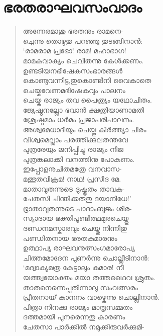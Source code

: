 
\section{ഭരതരാഘവസംവാദം}

\begin{verse}
അന്നേരമാശു ഭരതനും രാമനെ-\\
ച്ചെന്നു തൊഴുതു പറഞ്ഞു തുടങ്ങിനാന്‍:\\
‘രാമരാമ പ്രഭോ! രാമ! മഹാഭാഗ!\\
മാമകവാക്യം ചെവിതന്നു കേള്‍ക്കണം.\\
ഉണ്ടടിയനഭിഷേകസംഭാരങ്ങള്‍\\
കൊണ്ടുവന്നിട്ട,തുകൊണ്ടിനി വൈകാതെ\\
ചെയ്കവേണമഭിഷേകവും പാലനം\\
ചെയ്ക രാജ്യം തവ പൈത്ര്യം യഥോചിതം.\\
ജ്യേഷ്ഠനല്ലോ ഭവാന്‍ ക്ഷത്രിയാണാമതി\\
ശ്രേഷ്ഠമാം ധര്‍മം പ്രജാപരിപാലനം.\\
അശ്വമേധാദിയും ചെയ്തു കീര്‍ത്ത്യാ ചിരം\\
വിശ്വമെല്ലാം പരത്തിക്കുലതന്തവേ\\
പുത്രരേയും ജനിപ്പിച്ചു രാജ്യം നിജ\\
പുത്രങ്കലാക്കി വനത്തിനു പോകണം.\\
ഇപ്പോളനുചിതമത്രേ വനവാസ-\\
മത്ഭുതവിക്രമ! നാഥ! പ്രസീദ മേ.\\
മാതാവുതന്നുടെ ദുഷ്കൃതം താവക-\\
ചേതസി ചിന്തിക്കരുതു ദയാനിധേ!’\\
ഭ്രാതാവുതന്നുടെ പാദാംബുജം ശിര-\\
സ്യാദായ ഭക്തിപൂണ്ടിത്ഥമുരചെയ്തു\\
ദണ്ഡനമസ്കാരവും ചെയ്തു നിന്നിതു\\
പണ്ഡിതനായ ഭരതകുമാരനും\\
ഉത്ഥാപ്യ രാഘവനുത്സംഗമാരോപ്യ\\
ചിത്തമോദേന പുണര്‍ന്നു ചൊല്ലീടിനാന്‍:\\
‘മദ്വാക്യമത്ര കേട്ടാലും കുമാര! നീ\\
യത്ത്വയോക്തം മയാ തത്തഥൈവ ശ്രുതം.\\
താതനെന്നെപ്പതിന്നാലു സംവത്സരം\\
പ്രീതനായ് കാനനം വാഴ്കെന്നു ചൊല്ലിനാന്‍.\\
പിത്രാ നിനക്കു രാജ്യം മാതൃസമ്മതം\\
ദത്തമായീ പുനരെന്നതു കാരണം\\
ചേതസാ പാര്‍ക്കില്‍ നമുക്കിരുവര്‍ക്കുമി-\\

\end{verse}
